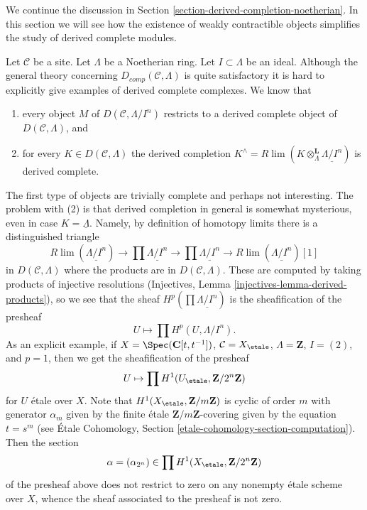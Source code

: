 \noindent
We continue the discussion in
Section \ref{section-derived-completion-noetherian}.
In this section we will see how the existence of
weakly contractible objects simplifies the study
of derived complete modules.

\medskip\noindent
Let $\mathcal{C}$ be a site. Let $\Lambda$ be a Noetherian ring.
Let $I \subset \Lambda$ be an ideal. Although the general theory
concerning $D_{comp}(\mathcal{C}, \Lambda)$ is quite satisfactory
it is hard to explicitly give examples of derived complete complexes.
We know that
\begin{enumerate}
\item every object $M$ of $D(\mathcal{C}, \Lambda/I^n)$ restricts to a
derived complete object of $D(\mathcal{C}, \Lambda)$, and
\item for every $K \in D(\mathcal{C}, \Lambda)$ the derived completion
$K^\wedge = R\lim (K \otimes_\Lambda^\mathbf{L} \underline{\Lambda/I^n})$
is derived complete.
\end{enumerate}
The first type of objects are trivially complete and perhaps not
interesting. The problem with (2) is that derived completion
in general is somewhat mysterious, even in case $K = \underline{\Lambda}$.
Namely, by definition of homotopy limits there
is a distinguished triangle
$$
R\lim(\underline{\Lambda/I^n}) \to
\prod \underline{\Lambda/I^n} \to
\prod \underline{\Lambda/I^n} \to
R\lim(\underline{\Lambda/I^n})[1]
$$
in $D(\mathcal{C}, \Lambda)$ where the products are in
$D(\mathcal{C}, \Lambda)$. These are computed by taking products
of injective resolutions
(Injectives, Lemma \ref{injectives-lemma-derived-products}),
so we see that the sheaf $H^p(\prod \underline{\Lambda/I^n})$
is the sheafification of the presheaf
$$
U \longmapsto \prod H^p(U, \Lambda/I^n).
$$
As an explicit example, if $X = \Spec(\mathbf{C}[t, t^{-1}])$,
$\mathcal{C} = X_\etale$, $\Lambda = \mathbf{Z}$, $I = (2)$, and
$p = 1$, then we get the sheafification of the presheaf
$$
U \mapsto \prod H^1(U_\etale, \mathbf{Z}/2^n\mathbf{Z})
$$
for $U$ \'etale over $X$. Note that $H^1(X_\etale, \mathbf{Z}/m\mathbf{Z})$
is cyclic of order $m$ with generator $\alpha_m$ given by the finite \'etale
$\mathbf{Z}/m\mathbf{Z}$-covering given by the equation $t = s^m$
(see \'Etale Cohomology, Section \ref{etale-cohomology-section-computation}).
Then the section
$$
\alpha = (\alpha_{2^n}) \in \prod H^1(X_\etale, \mathbf{Z}/2^n\mathbf{Z})
$$
of the presheaf above does not restrict to zero on any nonempty \'etale
scheme over $X$, whence the sheaf associated to the presheaf is not zero.


